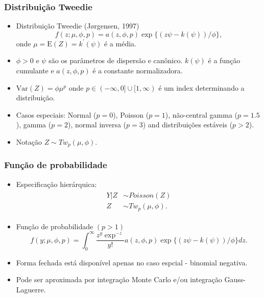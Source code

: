\documentclass[10pt, aspectratio=169]{beamer}\usepackage[]{graphicx}\usepackage[]{color}
\begin{document}
\begin{frame}[c]
\frametitle{Distribuição Tweedie}
\begin{itemize}
\item Distribuição Tweedie (J{\o}rgensen, 1997)
\begin{equation*}
\label{distri}
f(z; \mu, \phi, p) = a(z,\phi,p) \exp\{(z\psi - k(\psi))/\phi\},
\end{equation*}
onde $\mu = \mathrm{E}(Z) = k^{\prime}(\psi)$ é a média. 
\item $\phi > 0$ e $\psi$ são os parâmetros de dispersão e canônico.
$k(\psi)$ é a função cumulante e $a(z,\phi, p)$ é a constante normalizadora.
\item $\mathrm{Var}(Z) = \phi \mu^p$ onde $p \in (-\infty  ,0] \cup [1,\infty)$ é 
um index determinando a distribuição.
\item Casos especiais: Normal ($p=0$), Poisson ($p=1$), não-central gamma ($p=1.5$), gamma ($p=2$), normal inversa ($p=3$) and distribuições estáveis ($p > 2$).
\item Notação $Z \sim Tw_p(\mu, \phi)$.
\end{itemize}
\end{frame}

\begin{frame}[c]
\frametitle{Função de probabilidade}
\begin{itemize}
\item Especificação hierárquica:
\begin{align}
\begin{split}
\label{conditional}
Y|Z &\sim Poisson(Z) \\ 
Z &\sim Tw_p(\mu, \phi). \nonumber
\end{split}
\end{align}
\item Função de probabilidade $(p > 1)$
\begin{equation*}
f(y;\mu,\phi,p) = \int_0^\infty \frac{z^y \exp^{-z}}{y!} a(z,\phi,p) \exp\{(z\psi - k(\psi))/\phi\} dz.
\end{equation*}
\item Forma fechada está disponível apenas no caso espcial - binomial negativa.
\item Pode ser aproximada por integração Monte Carlo e/ou integração Gauss-Laguerre.
\end{itemize}
\end{frame}
\end{document}
